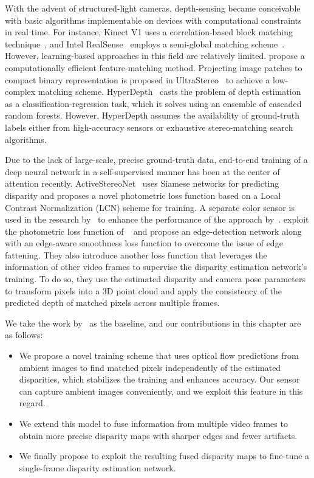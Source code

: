 With the advent of structured-light cameras, depth-sensing became conceivable with basic algorithms implementable on devices with computational constraints in real time. For instance, Kinect V1 uses a correlation-based block matching technique~\citep{scharstein2002taxonomy}, and Intel RealSense~\citep{keselman2017intel} employs a semi-global matching scheme~\citep{hirschmuller2007stereo}. However, learning-based approaches in this field are relatively limited. \cite{ryan2017low} propose a computationally efficient feature-matching method. Projecting image patches to compact binary representation is proposed in UltraStereo~\citep{fanello2017ultrastereo} to achieve a low-complex matching scheme. HyperDepth~\citep{ryan2016hyperdepth} casts the problem of depth estimation as a classification-regression task, which it solves using an ensemble of cascaded random forests. However, HyperDepth assumes the availability of ground-truth labels either from high-accuracy sensors or exhaustive stereo-matching search algorithms.

Due to the lack of large-scale, precise ground-truth data, end-to-end training of a deep neural network in a self-supervised manner has been at the center of attention recently. ActiveStereoNet~\citep{zhang2018activestereonet} uses Siamese networks for predicting disparity and proposes a novel photometric loss function based on a Local Contrast Normalization (LCN) scheme for training. A separate color sensor is used in the research by~\cite{kleitsiotis2019color} to enhance the performance of the approach by~\cite{zhang2018activestereonet}. \cite{riegler2019connecting} exploit the photometric loss function of ~\cite{zhang2018activestereonet} and propose an edge-detection network along with an edge-aware smoothness loss function to overcome the issue of edge fattening. They also introduce another loss function that leverages the information of other video frames to supervise the disparity estimation network's training. To do so, they use the estimated disparity and camera pose parameters to transform pixels into a 3D point cloud and apply the consistency of the predicted depth of matched pixels across multiple frames.

We take the work by~\cite{riegler2019connecting} as the baseline, and our contributions in this chapter are as follows:
\begin{itemize}
\item We propose a novel training scheme that uses optical flow predictions from ambient images to find matched pixels independently of the estimated disparities, which stabilizes the training and enhances accuracy. Our sensor can capture ambient images conveniently, and we exploit this feature in this regard.
\item We extend this model to fuse information from multiple video frames to obtain more precise disparity maps with sharper edges and fewer artifacts.
\item We finally propose to exploit the resulting fused disparity maps to fine-tune a single-frame disparity estimation network.
\end{itemize}

